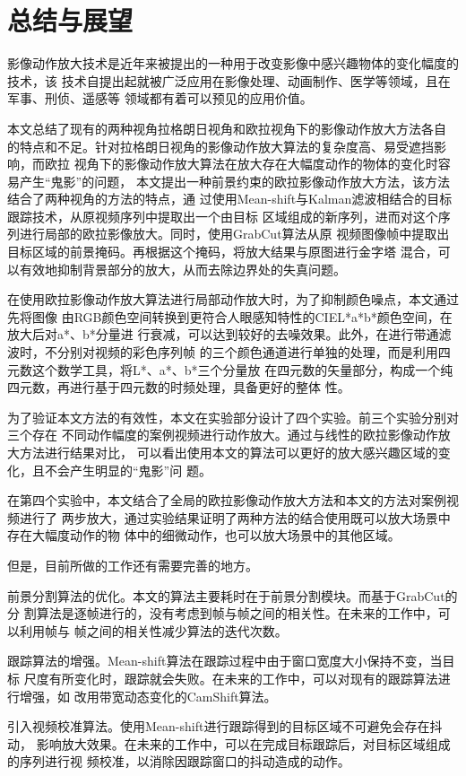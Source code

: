 \chapter{总结与展望}
\label{chap:conclusion}

影像动作放大技术是近年来被提出的一种用于改变影像中感兴趣物体的变化幅度的技术，该
技术自提出起就被广泛应用在影像处理、动画制作、医学等领域，且在军事、刑侦、遥感等
领域都有着可以预见的应用价值。

本文总结了现有的两种视角\pozhehao 拉格朗日视角和欧拉视角下的影像动作放大方法各自
的特点和不足。针对拉格朗日视角的影像动作放大算法的复杂度高、易受遮挡影响，而欧拉
视角下的影像动作放大算法在放大存在大幅度动作的物体的变化时容易产生“鬼影”的问题，
本文提出一种前景约束的欧拉影像动作放大方法，该方法结合了两种视角的方法的特点，通
过使用Mean-shift与Kalman滤波相结合的目标跟踪技术，从原视频序列中提取出一个由目标
区域组成的新序列，进而对这个序列进行局部的欧拉影像放大。同时，使用GrabCut算法从原
视频图像帧中提取出目标区域的前景掩码。再根据这个掩码，将放大结果与原图进行金字塔
混合，可以有效地抑制背景部分的放大，从而去除边界处的失真问题。

在使用欧拉影像动作放大算法进行局部动作放大时，为了抑制颜色噪点，本文通过先将图像
由RGB颜色空间转换到更符合人眼感知特性的CIEL*a*b*颜色空间，在放大后对a*、b*分量进
行衰减，可以达到较好的去噪效果。此外，在进行带通滤波时，不分别对视频的彩色序列帧
的三个颜色通道进行单独的处理，而是利用四元数这个数学工具，将L*、a*、b*三个分量放
在四元数的矢量部分，构成一个纯四元数，再进行基于四元数的时频处理，具备更好的整体
性。

为了验证本文方法的有效性，本文在实验部分设计了四个实验。前三个实验分别对三个存在
不同动作幅度的案例视频进行动作放大。通过与线性的欧拉影像动作放大方法进行结果对比，
可以看出使用本文的算法可以更好的放大感兴趣区域的变化，且不会产生明显的“鬼影”问
题。

在第四个实验中，本文结合了全局的欧拉影像动作放大方法和本文的方法对案例视频进行了
两步放大，通过实验结果证明了两种方法的结合使用既可以放大场景中存在大幅度动作的物
体中的细微动作，也可以放大场景中的其他区域。

但是，目前所做的工作还有需要完善的地方。

\begin{compactenum}
\item 前景分割算法的优化。本文的算法主要耗时在于前景分割模块。而基于GrabCut的分
  割算法是逐帧进行的，没有考虑到帧与帧之间的相关性。在未来的工作中，可以利用帧与
  帧之间的相关性减少算法的迭代次数。
\item 跟踪算法的增强。Mean-shift算法在跟踪过程中由于窗口宽度大小保持不变，当目标
  尺度有所变化时，跟踪就会失败。在未来的工作中，可以对现有的跟踪算法进行增强，如
  改用带宽动态变化的CamShift算法。
\item  引入视频校准算法。使用Mean-shift进行跟踪得到的目标区域不可避免会存在抖动，
  影响放大效果。在未来的工作中，可以在完成目标跟踪后，对目标区域组成的序列进行视
  频校准，以消除因跟踪窗口的抖动造成的动作。
\end{compactenum}

